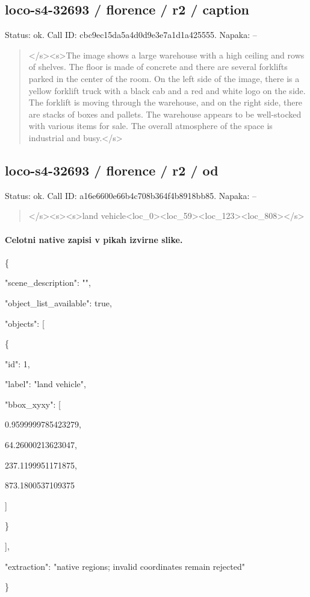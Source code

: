 \documentclass[10pt,a4paper]{article}
\begin{document}
\subsection*{loco-s4-32693 / florence / r2 / caption}
Status: ok. Call ID: cbc9ec15da5a4d0d9e3e7a1d1a425555. Napaka: --
\begin{quote}\footnotesize
</s>\allowbreak{}<s>\allowbreak{}The image shows a large warehouse with a high ceiling and rows of shelves. The floor is made of concrete and there are several forklifts parked in the center of the room. On the left side of the image,\allowbreak{} there is a yellow forklift truck with a black cab and a red and white logo on the side. The forklift is moving through the warehouse,\allowbreak{} and on the right side,\allowbreak{} there are stacks of boxes and pallets. The warehouse appears to be well-stocked with various items for sale. The overall atmosphere of the space is industrial and busy.</s>\allowbreak{}
\end{quote}
\subsection*{loco-s4-32693 / florence / r2 / od}
Status: ok. Call ID: a16e6600e66b4c708b364f4b8918bb85. Napaka: --
\begin{quote}\footnotesize
</s>\allowbreak{}<s>\allowbreak{}<s>\allowbreak{}land vehicle<loc\_0>\allowbreak{}<loc\_59>\allowbreak{}<loc\_123>\allowbreak{}<\allowbreak{}loc\_808>\allowbreak{}</s>\allowbreak{}
\end{quote}
\paragraph{Celotni native zapisi v pikah izvirne slike.}
\{\par
  "scene\_description":\allowbreak{} "",\allowbreak{}\par
  "object\_list\_available":\allowbreak{} true,\allowbreak{}\par
  "objects":\allowbreak{} [\par
    \{\par
      "id":\allowbreak{} 1,\allowbreak{}\par
      "label":\allowbreak{} "land vehicle",\allowbreak{}\par
      "bbox\_xyxy":\allowbreak{} [\par
        0.9599999785423279,\allowbreak{}\par
        64.26000213623047,\allowbreak{}\par
        237.1199951171875,\allowbreak{}\par
        873.1800537109375\par
      ]\par
    \}\par
  ],\allowbreak{}\par
  "extraction":\allowbreak{} "native regions; invalid coordinates remain rejected"\par
\}
\end{document}
